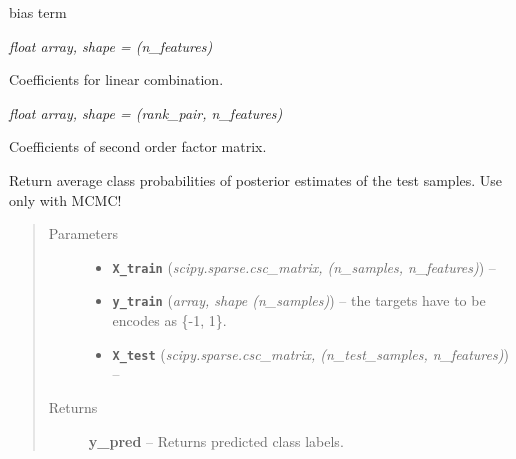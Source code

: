 \documentclass[letterpaper,10pt,english]{sphinxmanual}
\begin{document}
\begin{fulllineitems}
\begin{fulllineitems}
bias term

\end{fulllineitems}


\begin{fulllineitems}
\label{api:fastFM.mcmc.FMClassification.w_}
\emph{float \textbar{} array, shape = (n\_features)}

Coefficients for linear combination.

\end{fulllineitems}


\begin{fulllineitems}
\label{api:fastFM.mcmc.FMClassification.V_}
\emph{float \textbar{} array, shape = (rank\_pair, n\_features)}

Coefficients of second order factor matrix.

\end{fulllineitems}


\begin{fulllineitems}
\label{api:fastFM.mcmc.FMClassification.fit_predict}
Return average class probabilities of posterior estimates of the
test samples.
Use only with MCMC!
\begin{quote}\begin{description}
\item[{Parameters}] \leavevmode\begin{itemize}
\item {} 
\textbf{\texttt{X\_train}} (\emph{scipy.sparse.csc\_matrix, (n\_samples, n\_features)}) -- 

\item {} 
\textbf{\texttt{y\_train}} (\emph{array, shape (n\_samples)}) -- the targets have to be encodes as \{-1, 1\}.

\item {} 
\textbf{\texttt{X\_test}} (\emph{scipy.sparse.csc\_matrix, (n\_test\_samples, n\_features)}) -- 

\end{itemize}

\item[{Returns}] \leavevmode
\textbf{y\_pred} --
Returns predicted class labels.


\end{description}
\end{quote}
\end{fulllineitems}
\end{fulllineitems}
\end{document}
